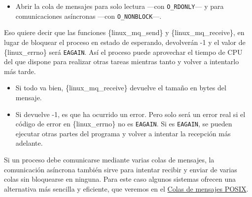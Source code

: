 \begin{itemize}
\item
  Abrir la cola de mensajes para solo lectura ---con
  \texttt{O\_RDONLY}--- y para comunicaciones asíncronas ---con
  \texttt{O\_NONBLOCK}---.
\end{itemize}

Eso quiere decir que las funciones \{linux\_mq\_send\} y
\{linux\_mq\_receive\}, en lugar de bloquear el proceso en estado de
esperando, devolverán -1 y el valor de \{linux\_errno\} será
\texttt{EAGAIN}. Así el proceso puede aprovechar el tiempo de CPU del
que dispone para realizar otras tareas mientras tanto y volver a
intentarlo más tarde.

\begin{Shaded}
\begin{Highlighting}[]
\OperatorTok{=}\OperatorTok{(}\OperatorTok{,} \OperatorTok{\&}\OperatorTok{,} \OperatorTok{(}\OperatorTok{),} \OperatorTok{\&}\OperatorTok{);}
 \OperatorTok{(}\OperatorTok{\textgreater{}}  \OperatorTok{)} 
\OperatorTok{\{}
\OperatorTok{\}}
 \OperatorTok{(}\OperatorTok{\textless{}}  \OperatorTok{\&\&}\OperatorTok{!=}\OperatorTok{)} 
\OperatorTok{\{}
\OperatorTok{\}}
\end{Highlighting}
\end{Shaded}

\begin{itemize}
\item
  Si todo va bien, \{linux\_mq\_receive\} devuelve el tamaño en bytes
  del mensaje.
\item
  Si devuelve -1, es que ha ocurrido un error. Pero solo será un error
  real si el código de error en \{linux\_errno\} no es \texttt{EAGAIN}.
  Si es \texttt{EAGAIN}, se pueden ejecutar otras partes del programa y
  volver a intentar la recepción más adelante.
\end{itemize}

Si un proceso debe comunicarse mediante varias colas de mensajes, la
comunicación asíncrona también sirve para intentar recibir y enviar de
varias colas sin bloquearse en ninguna. Para este caso algunos sistemas
ofrecen una alternativa más sencilla y eficiente, que veremos en el
\hyperref[_colas_de_mensajes_posix]{Colas de mensajes POSIX}.


